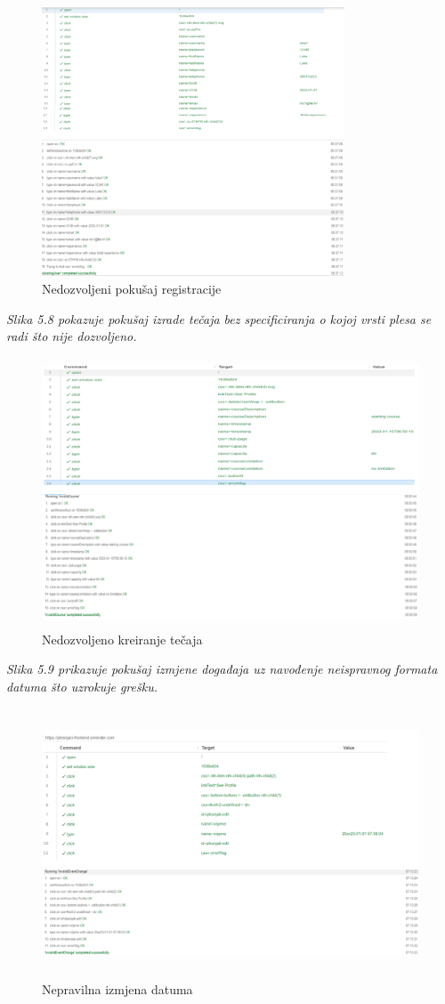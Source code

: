 	\begin{figure}[H]
		\centering
		\includegraphics[width=\textwidth,height=8cm]{slike/slike_testova/SELENIUM_IDE/3.PNG}
		\caption{Nedozvoljeni pokušaj registracije}
		\label{fig:my_label}
	\end{figure}
	\newpage
	\textit{
		Slika 5.8 pokazuje pokušaj izrade tečaja bez specificiranja o kojoj vrsti plesa se radi što nije dozvoljeno. }
	\begin{figure}[H]
		\centering
		\includegraphics[width=\textwidth,height=8cm]{slike/slike_testova/SELENIUM_IDE/4.PNG}
		\caption{Nedozvoljeno kreiranje tečaja}
		\label{fig:my_label}
	\end{figure}
\textit{
	Slika 5.9 prikazuje pokušaj izmjene događaja uz navođenje neispravnog formata datuma što uzrokuje grešku. }
\begin{figure}[H]
	\centering
	\includegraphics[width=\textwidth,height=8cm]{slike/slike_testova/SELENIUM_IDE/5.PNG}
	\caption{Nepravilna izmjena datuma}
	\label{fig:my_label}
\end{figure}
